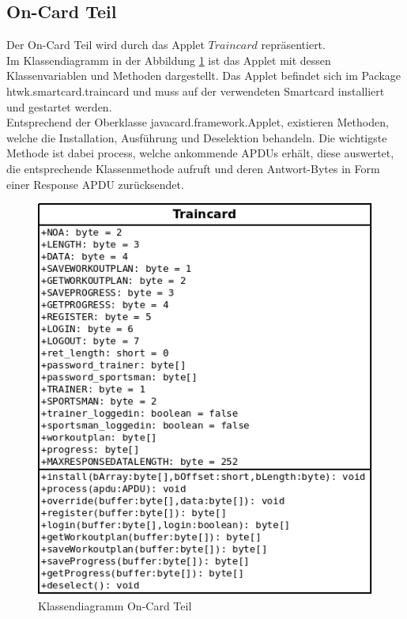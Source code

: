 \subsection{On-Card Teil}
\label{subsec:3.2}
Der On-Card Teil wird durch das Applet $Traincard$ repräsentiert.
\\


Im Klassendiagramm in der Abbildung \ref{diaoncard} ist das Applet mit dessen Klassenvariablen und Methoden dargestellt.
Das Applet befindet sich im Package\\htwk.smartcard.traincard und muss auf der verwendeten Smartcard installiert und gestartet werden.
\\

Entsprechend der Oberklasse javacard.framework.Applet, existieren Methoden, welche die Installation, Ausführung und Deselektion behandeln.
Die wichtigste Methode ist dabei process, welche ankommende APDUs erhält, diese auswertet, die entsprechende Klassenmethode aufruft und deren Antwort-Bytes in Form einer Response APDU zurücksendet.

\begin{figure}[htb]
\begin{center}
 \includegraphics[width=.7\hsize]{./images/Klassendiagramm_oncard.png}
\end{center}
\caption[Klassendiagramm On-Card Teil]{\label{diaoncard}Klassendiagramm On-Card Teil}
\end{figure}




